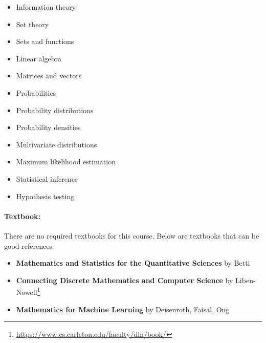 \documentclass[12pt]{scrartcl}
\begin{document}
\begin{multicols}{2}
\begin{itemize}
\item Information theory %
\item Set theory %
\item Sets and functions
\item Linear algebra
\item Matrices and vectors
\item Probabilities
\item Probability distributions 
\item Probability densities
\item Multivariate distributions
\item Maximum likelihood estimation
\item Statistical inference
\item Hypothesis testing
\end{itemize}
\end{multicols}

\paragraph{Textbook:} 
There are no required textbooks for this course. Below are textbooks that can be good references: 
\begin{itemize}

\item \textbf{Mathematics and Statistics for the Quantitative Sciences} by Betti
\item \textbf{Connecting Discrete Mathematics and Computer Science} by Liben-Nowell\footnote{\url{https://www.cs.carleton.edu/faculty/dln/book/}}
\item \textbf{Mathematics for Machine Learning} by Deisenroth, Faisal, Ong
\end{itemize}
\end{document}
